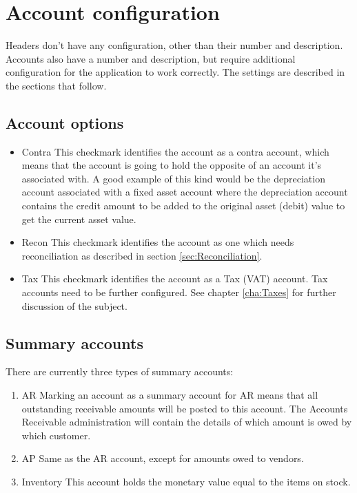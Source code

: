 \documentclass[10pt,A4]{book}
\begin{document}
\section{Account configuration}

Headers don't have any configuration, other than their number and description. Accounts also
have a number and description, but require additional configuration for the application to work
correctly. The settings are described in the sections that follow.

\subsection{Account options}
\label{sec:AccountOptions}
\begin{itemize}
\item Contra This checkmark identifies the account as a contra account, which means
   that the account is going to hold the opposite of an account it's associated with.
   A good example of this kind would be the depreciation account associated with a fixed
   asset account where the depreciation account contains the credit amount to be added to
   the original asset (debit) value to get the current asset value.
\item Recon This checkmark identifies the account as one which needs reconciliation as
   described in section \ref{sec:Reconciliation}.
\item Tax This checkmark identifies the account as a Tax (VAT) account. Tax accounts need
   to be further configured. See chapter \ref{cha:Taxes} for further discussion of the
   subject.
\end{itemize}

\subsection{Summary accounts}

There are currently three types of summary accounts:

\begin{enumerate}
\item AR Marking an account as a summary account for AR means that all outstanding
   receivable amounts will be posted to this account. The Accounts Receivable administration
   will contain the details of which amount is owed by which customer.
\item AP Same as the AR account, except for amounts owed to vendors.
\item Inventory This account holds the monetary value equal to the items on stock.
\end{enumerate}
\end{document}
